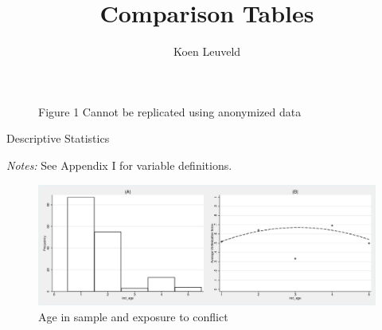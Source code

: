\documentclass[10pt,a4paper]{scrartcl} %
\begin{document}
\author{Koen Leuveld}




\title{Comparison Tables }

\maketitle

\begin{figure}
  \begin{center}
    \caption{Figure 1 Cannot be replicated using anonymized data} \label{fig:slf:conflictexposure}
  \end{center}
\end{figure}

\begin{table}
  \begin{threeparttable}
    \caption{Descriptive Statistics}
    \label{tab:slf:summstats}
    \renewcommand{\arraystretch}{0.6}
    
    \begin{tablenotes}
      \footnotesize
      \item \textit{Notes:} See Appendix I for variable definitions.
    \end{tablenotes}
   \end{threeparttable}
\end{table}

\begin{figure}
  \begin{center}
    \includegraphics[width=\linewidth]{"Outputs_anon/figures/f2_agefreq_agewe.eps"}
    \caption{Age in sample and exposure to conflict}
    \label{fig:slf:ageconflict}
  \end{center}
\end{figure}
\end{document}
